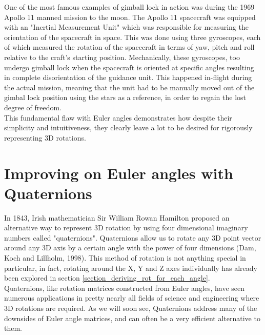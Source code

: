 \documentclass[12pt, a4paper]{article}
\begin{document}
One of the most famous examples of gimball lock in action was during the 1969
Apollo 11 manned mission to the moon. The Apollo 11 spacecraft was equipped with
an "Inertial Measurement Unit" which was responsible for measuring the
orientation of the spacecraft in space. This was done using three gyroscopes,
each of which measured the rotation of the spacecraft in terms of yaw, pitch and
roll relative to the craft's starting position. Mechanically, these gyroscopes,
too undergo gimball lock when the spacecraft is oriented at specific angles
resulting in complete disorientation of the guidance unit. This happened
in-flight during the actual mission, meaning that the unit had to be manually
moved out of the gimbal lock position using the stars as a reference, in order
to regain the lost degree of freedom. \\

This fundamental flaw with Euler angles demonstrates how despite their
simplicity and intuitiveness, they clearly leave a lot to be desired for
rigorously representing 3D rotations. \\


\section{Improving on Euler angles with Quaternions}
In 1843, Irish mathematician Sir William Rowan Hamilton proposed an alternative
way to represent 3D rotation by using four dimensional imaginary numbers called
"quaternions". Quaternions allow us to rotate any 3D point vector around any 3D
axis by a certain angle with the power of four dimensions (Dam, Koch and Lillholm, 1998). This method of
rotation is not anything special in particular, in fact, rotating around the X,
Y and Z axes individually has already been explored in section
\ref{section_deriving_rot_for_each_angle}. \\

Quaternions, like rotation matrices constructed from Euler angles, have seen
numerous applications in pretty nearly all fields of science and engineering
where 3D rotations are required. As we will soon see, Quaternions address many
of the downsides of Euler angle matrices, and can often be a very efficient
alternative to them.
\end{document}
